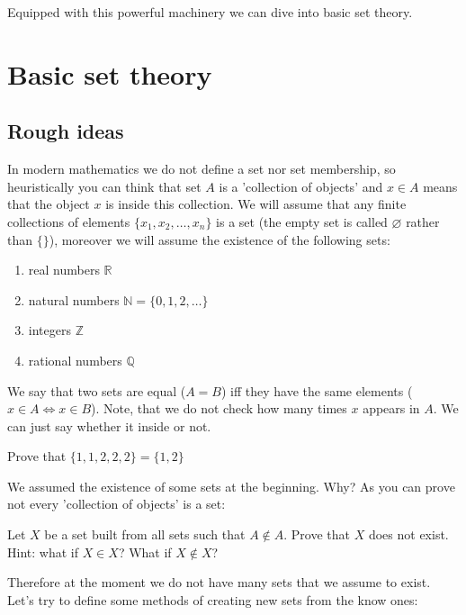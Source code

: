 \noindent Equipped with this powerful machinery we can dive into basic set theory.

\section{Basic set theory}
\label{sec:basic_set_theory}

\subsection{Rough ideas}
In modern mathematics we do not define a set nor set membership, so heuristically you can think that set $A$
is a 'collection of objects' and $x\in A$ means that the object $x$ is inside this collection. We will assume that any finite collections of elements $\{x_1, x_2, \dots, x_n\}$ is a set 
(the empty set is called $\varnothing$ rather than $\{\}$), moreover we will assume the existence of the following sets:
\begin{enumerate}
	\item real numbers $\mathbb R$
	\item natural numbers $\mathbb N=\{0,1,2,\dots\}$
	\item integers $\mathbb Z$
	\item rational numbers $\mathbb Q$
\end{enumerate}

\noindent We say that two sets are equal ($A=B$) iff they have the same elements 
($x\in A\Leftrightarrow x\in B$). Note, that we do not check how many times $x$ appears in $A$. We can
just say whether it inside or not.

\begin{prob}
Prove that $\{1,1,2,2,2\}=\{1,2\}$
\end{prob}

\noindent We assumed the existence of some sets at the beginning. Why? As you can prove not every 'collection of objects' is a set:

\begin{prob}
	Let $X$ be a set built from all sets such that $A\notin A.$ Prove that $X$ does not exist. Hint: what if $X\in X$? What if $X\notin X$?
\end{prob}

Therefore at the moment we do not have many sets that we assume to exist. Let's try to define some methods of creating new sets from the know ones:

